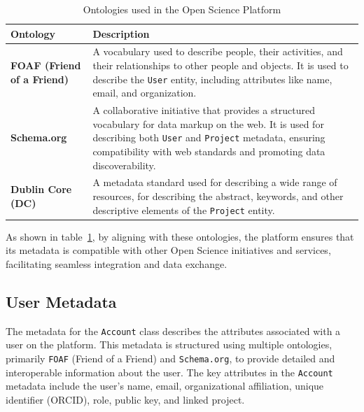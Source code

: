 \documentclass{article}
\begin{document}
\begin{table}[h]
      \centering
      \renewcommand{\arraystretch}{1.2}
      \begin{tabularx}{\textwidth}{|l|X|}            \hline
            \textbf{Ontology}                  & \textbf{Description}                                                                                                                                                                                                                                   \\ \hline
            \textbf{FOAF (Friend of a Friend)} & A vocabulary used to describe people, their activities, and their relationships to other people and objects. It is used to describe the \texttt{User} entity, including attributes like name, email, and organization.                                 \\ \hline
            \textbf{Schema.org}                & A collaborative initiative that provides a structured vocabulary for data markup on the web. It is used for describing both \texttt{User} and \texttt{Project} metadata, ensuring compatibility with web standards and promoting data discoverability. \\ \hline
            \textbf{Dublin Core (DC)}          & A metadata standard used for describing a wide range of resources, for describing the abstract, keywords, and other descriptive elements of the \texttt{Project} entity.                                                                               \\ \hline
      \end{tabularx}
      \caption{Ontologies used in the Open Science Platform}
      \label{tab:ontologies}
\end{table}


As shown in table~\ref{tab:ontologies}, by aligning with these ontologies, the platform ensures that its metadata is compatible with other Open Science initiatives and services, facilitating seamless integration and data exchange.




\subsection{User Metadata}
The metadata for the \texttt{Account} class describes the attributes associated with a user on the platform. This metadata is structured using multiple ontologies, primarily \texttt{FOAF} (Friend of a Friend) and \texttt{Schema.org}, to provide detailed and interoperable information about the user. The key attributes in the \texttt{Account} metadata include the user's name, email, organizational affiliation, unique identifier (ORCID), role, public key, and linked project.
\end{document}
